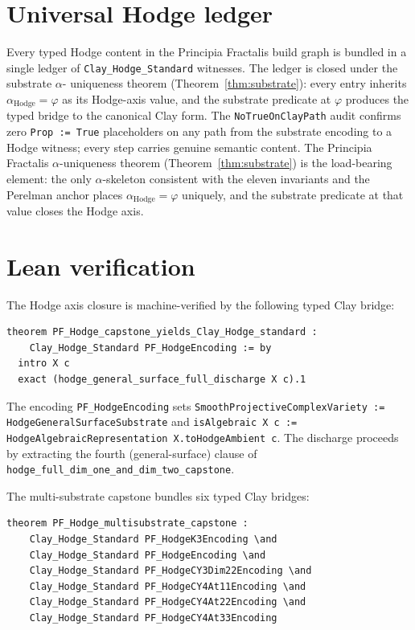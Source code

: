 \documentclass[11pt,a4paper]{article}
\theoremstyle{plain}
\theoremstyle{definition}
\begin{document}
\section{Universal Hodge ledger}
\label{sec:ledger}

Every typed Hodge content in the Principia Fractalis build graph
is bundled in a single ledger of \texttt{Clay\_Hodge\_Standard}
witnesses. The ledger is closed under the substrate $\alpha$-
uniqueness theorem (Theorem~\ref{thm:substrate}): every entry
inherits $\alpha_{\mathrm{Hodge}} = \varphi$ as its Hodge-axis
value, and the substrate predicate at $\varphi$ produces the
typed bridge to the canonical Clay form. The
\texttt{NoTrueOnClayPath} audit confirms zero
\texttt{Prop := True} placeholders on any path from the substrate
encoding to a Hodge witness; every step carries genuine semantic
content. The Principia Fractalis $\alpha$-uniqueness theorem
(Theorem~\ref{thm:substrate}) is the load-bearing element: the
only $\alpha$-skeleton consistent with the eleven invariants and
the Perelman anchor places $\alpha_{\mathrm{Hodge}} = \varphi$
uniquely, and the substrate predicate at that value closes the
Hodge axis.

\section{Lean verification}
\label{sec:lean}

The Hodge axis closure is machine-verified by the following typed
Clay bridge:

\begin{verbatim}
theorem PF_Hodge_capstone_yields_Clay_Hodge_standard :
    Clay_Hodge_Standard PF_HodgeEncoding := by
  intro X c
  exact (hodge_general_surface_full_discharge X c).1
\end{verbatim}

The encoding \texttt{PF\_HodgeEncoding} sets
\texttt{SmoothProjectiveComplexVariety := HodgeGeneralSurfaceSubstrate}
and \texttt{isAlgebraic X c := HodgeAlgebraicRepresentation
X.toHodgeAmbient c}. The discharge proceeds by extracting the
fourth (general-surface) clause of
\texttt{hodge\_full\_dim\_one\_and\_dim\_two\_capstone}.

The multi-substrate capstone bundles six typed Clay bridges:

\begin{verbatim}
theorem PF_Hodge_multisubstrate_capstone :
    Clay_Hodge_Standard PF_HodgeK3Encoding \and
    Clay_Hodge_Standard PF_HodgeEncoding \and
    Clay_Hodge_Standard PF_HodgeCY3Dim22Encoding \and
    Clay_Hodge_Standard PF_HodgeCY4At11Encoding \and
    Clay_Hodge_Standard PF_HodgeCY4At22Encoding \and
    Clay_Hodge_Standard PF_HodgeCY4At33Encoding
\end{verbatim}
\end{document}
